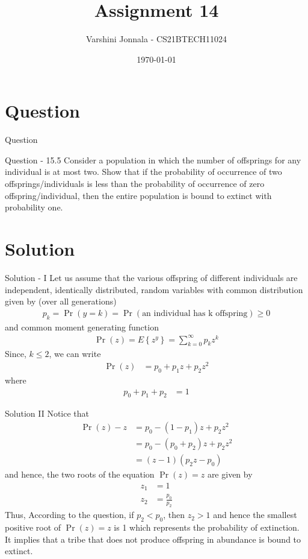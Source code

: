 \documentclass{beamer}
\title{Assignment 14}
\author{Varshini Jonnala - CS21BTECH11024}
\date{\today}
\providecommand{\pr}[1]{\ensuremath{\Pr\left(#1\right)}}
\providecommand{\cbrak}[1]{\ensuremath{\left\{#1\right\}}}
\begin{document}
\begin{frame}
    \titlepage 
\end{frame}

\section{Question}
\begin{frame}{Question}
\begin{block}{Question - 15.5}
Consider a population in which the number of offsprings for any individual is at most two. Show that if the probability of occurrence of two offsprings/individuals is less than the probability of occurrence of zero offspring/individual, then the entire population is bound to extinct with probability one.
\end{block}
\end{frame}

\section{Solution}
\begin{frame}{Solution - I}
    Let us assume that the various offspring of different individuals are independent, identically distributed, random variables with common distribution given by (over all generations) 
\begin{align}
    p_k = \pr{y = k} = \pr{\text{an individual has k offspring}} \geq 0
    \end{align}
    and common moment generating function
    \begin{align}
        \pr{z} = E\cbrak{z^y} = \sum_{k=0}^\infty p_k z^k
    \end{align}
Since, $k \leq 2$, we can write 
\begin{align}
    \pr{z} &= p_0 + p_1 z + p_2 z^2
    \end{align}
    where 
 \begin{align}   
    p_0 + p_1 + p_2 &= 1
\end{align}
\end{frame}       

\begin{frame}{Solution II}
   Notice that
   \begin{align}
       \pr{z} - z &= p_0 - (1-p_1)z + p_2 z^2\\
    &= p_0 - (p_0 + p_2)z + p_2 z^2\\
    &= (z-1)(p_2 z - p_0)
   \end{align}
    and hence, the two roots of the equation $\pr{z} = z$ are given by 
    \begin{align}
        z_1 &= 1 \\
        z_2 &= \frac{p_0}{p_2}
    \end{align}
    Thus, According to the question, if $p_2 < p_0$, then $z_2 > 1$ and hence the smallest positive root of $\pr{z} = z$ is 1 which represents the probability of extinction. It implies that a tribe that does not produce offspring in abundance is bound to extinct.
 \end{frame}
\end{document}
